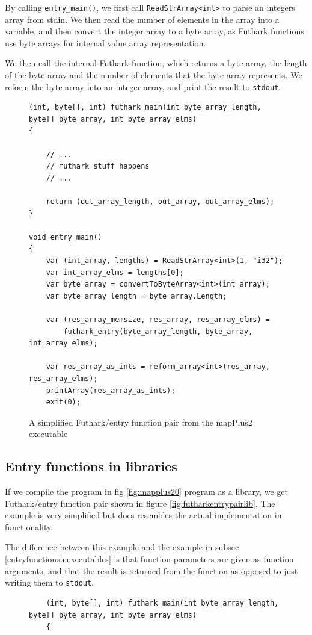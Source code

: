 \begin{description}
By calling \texttt{entry\_main()}, we first call \texttt{ReadStrArray<int>} to parse an integers
array from stdin. We then read the number of elements in the array into a
variable, and then convert the integer array to a byte array, as Futhark
functions use byte arrays for internal value array representation.

We then call the internal Futhark function, which returns a byte array, the
length of the byte array and the number of elements that the byte array
represents.
We reform the byte array into an integer array, and print the result to \texttt{stdout}.

\begin{figure}[H]
  \centering
\begin{verbatim}
(int, byte[], int) futhark_main(int byte_array_length, byte[] byte_array, int byte_array_elms)
{

    // ...
    // futhark stuff happens
    // ...

    return (out_array_length, out_array, out_array_elms);
}

void entry_main()
{
    var (int_array, lengths) = ReadStrArray<int>(1, "i32");
    var int_array_elms = lengths[0];
    var byte_array = convertToByteArray<int>(int_array);
    var byte_array_length = byte_array.Length;

    var (res_array_memsize, res_array, res_array_elms) =
        futhark_entry(byte_array_length, byte_array, int_array_elms);

    var res_array_as_ints = reform_array<int>(res_array, res_array_elms);
    printArray(res_array_as_ints);
    exit(0);
\end{verbatim}
  \caption{A simplified Futhark/entry function pair from the mapPlus2 executable}
  \label{fig:futharkentrypairexe}
\end{figure}

\subsection{Entry functions in libraries}
If we compile the program in fig \ref{fig:mapplus20} program as a library, we get Futhark/entry function pair
shown in figure \ref{fig:futharkentrypairlib}. The example is very simplified
but does resembles the actual implementation in functionality.

The difference between this example and the example in subsec
\ref{entryfunctionsinexecutables} is that function parameters are given as
function arguments, and that the result is returned from the function as opposed
to just writing them to \texttt{stdout}.
\begin{figure}[H]
  \centering
\begin{verbatim}
    (int, byte[], int) futhark_main(int byte_array_length, byte[] byte_array, int byte_array_elms)
    {


\end{verbatim}
\end{figure}
\end{description}
